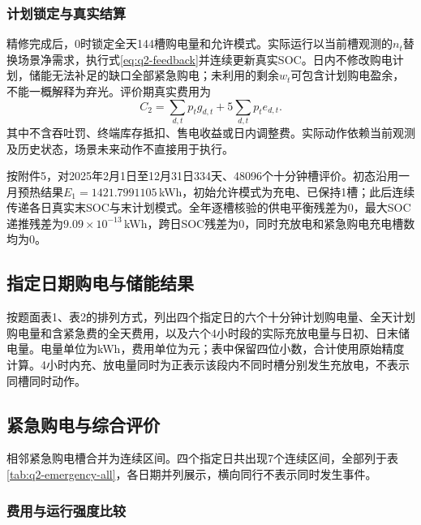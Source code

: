 \subsubsection{计划锁定与真实结算}

精修完成后，0时锁定全天144槽购电量和允许模式。实际运行以当前槽观测的$n_t$替换场景净需求，执行式\eqref{eq:q2-feedback}并连续更新真实SOC。日内不修改购电计划，储能无法补足的缺口全部紧急购电；未利用的剩余$w_t$可包含计划购电盈余，不能一概解释为弃光。评价期真实费用为
\begin{equation}\label{eq:q2-real-cost}
 C_2=\sum_{d,t}p_tg_{d,t}+5\sum_{d,t}p_te_{d,t}.
\end{equation}
其中不含吞吐罚、终端库存抵扣、售电收益或日内调整费。实际动作依赖当前观测及历史状态，场景未来动作不直接用于执行。

按附件5，对2025年2月1日至12月31日334天、48096个十分钟槽评价。初态沿用一月预热结果$E_{1}=1421.7991105$\,kWh，初始允许模式为充电、已保持1槽；此后连续传递各日真实末SOC与末计划模式。全年逐槽核验的供电平衡残差为0，最大SOC递推残差为$9.09\times10^{-13}$\,kWh，跨日SOC残差为0，同时充放电和紧急购电充电槽数均为0。

\clearpage
\subsection{指定日期购电与储能结果}

按题面表1、表2的排列方式，列出四个指定日的六个十分钟计划购电量、全天计划购电量和含紧急费的全天费用，以及六个4小时段的实际充放电量与日初、日末储电量。电量单位为kWh，费用单位为元；表中保留四位小数，合计使用原始精度计算。4小时内充、放电量同时为正表示该段内不同时槽分别发生充放电，不表示同槽同时动作。


\clearpage
\subsection{紧急购电与综合评价}

相邻紧急购电槽合并为连续区间。四个指定日共出现7个连续区间，全部列于表\ref{tab:q2-emergency-all}，各日期并列展示，横向同行不表示同时发生事件。


\subsubsection{费用与运行强度比较}



